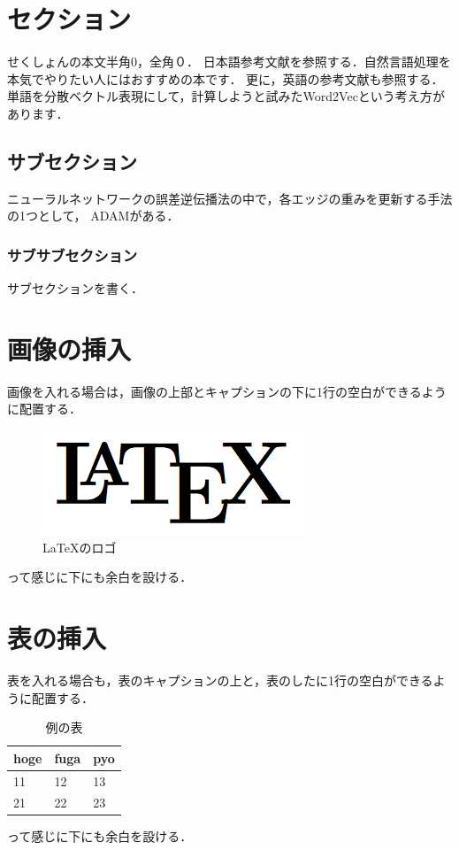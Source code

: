 \documentclass[10pt, a4j, uplatex, twocolumn]{jsarticle}
\begin{document}


\section{セクション}
せくしょんの本文半角0，全角０．
日本語参考文献を参照する．自然言語処理を本気でやりたい人にはおすすめの本\cite{Natural_Language_Processing_by_Deep_Learning}です．
更に，英語の参考文献も参照する．単語を分散ベクトル表現にして，計算しようと試みたWord2Vecという考え方\cite{Mikolov_word2vec}があります．
\subsection{サブセクション}
ニューラルネットワークの誤差逆伝播法の中で，各エッジの重みを更新する手法の1つとして，
ADAM\cite{ADAM}がある．

\subsubsection{サブサブセクション}
サブセクションを書く．

\section{画像の挿入}
画像を入れる場合は，画像の上部とキャプションの下に1行の空白ができるように配置する．
\begin{figure}[H]
    \centering
    \includegraphics[width=0.8\linewidth]{latex-logo.png}
    \caption{LaTeXのロゴ}
    \label{fig:latex}
\end{figure}
って感じに下にも余白を設ける．
\section{表の挿入}
\lipsum[1]
表を入れる場合も，表のキャプションの上と，表のしたに1行の空白ができるように配置する．
\begin{table}[H]
\centering
\caption{例の表}
\label{tab:example}
\begin{tabular}{@{}lll@{}}
\toprule
hoge & fuga & pyo \\
\midrule
11   & 12   & 13  \\
21   & 22   & 23 \\
\bottomrule
\end{tabular}
\end{table}
って感じに下にも余白を設ける．
\end{document}
